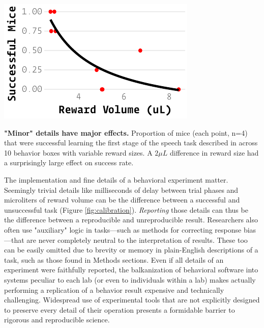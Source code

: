 \documentclass[nohyper, justified, notitlepage, marginals=raggedright,twoside=false,debug]{tufte-autopilot}
\begin{document}
\begin{marginfigure}[1.75cm]
\includegraphics[]{figures/calibration_warning.pdf}
\caption{\textbf{"Minor" details have major effects.} Proportion of mice (each point, n=4) that were successful learning the first stage of the speech task described in \citep{saundersMiceCanLearn2019} across 10 behavior boxes with variable reward sizes. A $2 \mu L$ difference in reward size had a surprisingly large effect on success rate.}
\label{fig:calibration}
\end{marginfigure}

The implementation and fine details of a behavioral experiment matter. Seemingly trivial details like milliseconds of delay between trial phases and microliters of reward volume can be the difference between a successful and unsuccessful task (Figure \ref{fig:calibration}). \textit{Reporting} those details can thus be the difference between a reproducible and unreproducible result.  Researchers also often use "auxiliary" logic in tasks---such as methods for correcting response bias---that are never completely neutral to the interpretation of results. These too can be easily omitted due to brevity or memory in plain-English descriptions of a task, such as those found in Methods sections. Even if all details of an experiment were faithfully reported, the balkanization of behavioral software into systems peculiar to each lab (or even to individuals within a lab) makes actually performing a replication of a behavior result expensive and technically challenging. Widespread use of experimental tools that are not explicitly designed to preserve every detail of their operation presents a formidable barrier to rigorous and reproducible science\citep{wallReliabilityStartsExperimental2019}.
\end{document}
